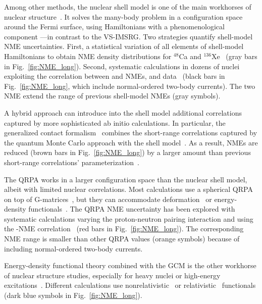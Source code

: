 Among other methods, the nuclear shell model is one of the main workhorses of nuclear structure~\cite{Caurier:2004gf,Otsuka:2018bqq,Brown:2001zz}. It solves the many-body problem in a configuration space around the Fermi surface, using Hamiltonians with a phenomenological component ---in contrast to the VS-IMSRG.
Two strategies quantify shell-model NME uncertainties. First, a statistical variation of all elements of shell-model Hamiltonians to obtain NME density distributions for $^{48}$Ca and $^{136}$Xe~\cite{Horoi:2022ley,Horoi:2023uah} (gray bars in Fig.~\ref{fig:NME_long}). Second, systematic calculations in dozens of nuclei exploiting the correlation between \bbonu and \bbtnu NMEs, and \bbtnu data~\cite{Jokiniemi:2022ayc} (black bars in Fig.~\ref{fig:NME_long}, which include normal-ordered two-body currents). The two \bbonu NME extend the range of previous shell-model NMEs (gray symbols).

A hybrid approach can introduce into the shell model additional correlations captured by more sophisticated ab initio calculations. In particular, the generalized contact formalism~\cite{Weiss:2016obx} combines the short-range correlations captured by the quantum Monte Carlo approach with the shell model~\cite{Weiss:2021rig}. As a result, NMEs are reduced (brown bars in Fig.~\ref{fig:NME_long}) by a larger amount than previous short-range correlations' parameterization~\cite{Simkovic:2009pp}.

The QRPA
works in a larger configuration space than the nuclear shell model, albeit with limited nuclear correlations. Most calculations use a spherical QRPA on top of G-matrices~\cite{Hyvarinen:2015bda,Simkovic:2018hiq}, but they can accommodate deformation~\cite{Fang:2018tui} or energy-density functionals~\cite{Mustonen:2013zu}. The QRPA NME uncertainty has been explored with systematic calculations varying the proton-neutron pairing interaction and using the \bbonu-\bbtnu NME correlation~\cite{Jokiniemi:2022ayc} (red bars in Fig.~\ref{fig:NME_long}). The corresponding NME range is smaller than other QRPA values (orange symbols) because of including normal-ordered two-body currents.

Energy-density functional theory combined with the GCM is the other workhorse of nuclear structure studies, especially for heavy nuclei or high-energy excitations~\cite{Paar:2007bk,Robledo:2018cdj}. Different calculations use nonrelativistic~\cite{Rodriguez:2010mn,LopezVaquero:2013yji}
or relativistic~\cite{Yao:2014uta} functionals (dark blue symbols in Fig.~\ref{fig:NME_long}).

